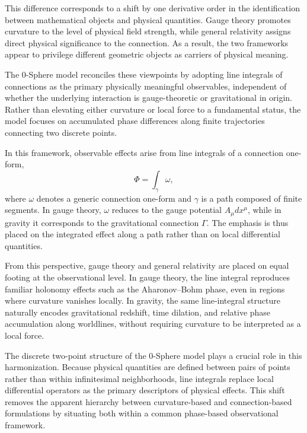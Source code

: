 \documentclass[12pt,letterpaper]{article} %
\begin{document}
This difference corresponds to a shift by one derivative order in the identification between mathematical objects and physical quantities. Gauge theory promotes curvature to the level of physical field strength, while general relativity assigns direct physical significance to the connection. As a result, the two frameworks appear to privilege different geometric objects as carriers of physical meaning.

The 0-Sphere model reconciles these viewpoints by adopting line integrals of connections as the primary physically meaningful observables, independent of whether the underlying interaction is gauge-theoretic or gravitational in origin. Rather than elevating either curvature or local force to a fundamental status, the model focuses on accumulated phase differences along finite trajectories connecting two discrete points.

In this framework, observable effects arise from line integrals of a connection one-form,
\begin{equation}
\Phi = \int_{\gamma} \omega ,
\end{equation}
where $\omega$ denotes a generic connection one-form and $\gamma$ is a path composed of finite segments.  
In gauge theory, $\omega$ reduces to the gauge potential $A_\mu dx^\mu$, while in gravity it corresponds to the gravitational connection $\Gamma$. The emphasis is thus placed on the integrated effect along a path rather than on local differential quantities.

From this perspective, gauge theory and general relativity are placed on equal footing at the observational level. In gauge theory, the line integral reproduces familiar holonomy effects such as the Aharonov--Bohm phase, even in regions where curvature vanishes locally. In gravity, the same line-integral structure naturally encodes gravitational redshift, time dilation, and relative phase accumulation along worldlines, without requiring curvature to be interpreted as a local force.

The discrete two-point structure of the 0-Sphere model plays a crucial role in this harmonization. Because physical quantities are defined between pairs of points rather than within infinitesimal neighborhoods, line integrals replace local differential operators as the primary descriptors of physical effects. This shift removes the apparent hierarchy between curvature-based and connection-based formulations by situating both within a common phase-based observational framework.
\end{document}
